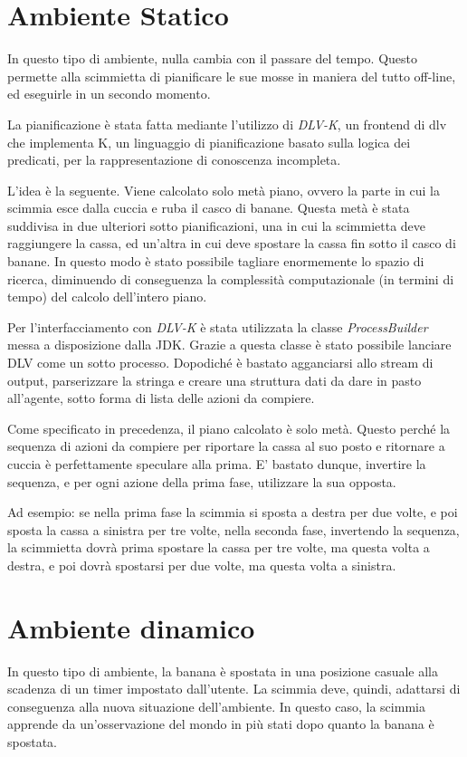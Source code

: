 \documentclass[a4paper,10pt]{article}
\begin{document}
    \section{Ambiente Statico}
	In questo tipo di ambiente, nulla cambia con il passare del tempo. Questo permette alla scimmietta di pianificare le sue mosse in
	maniera del tutto off-line, ed eseguirle in un secondo momento.
	
	La pianificazione è stata fatta mediante l'utilizzo di \emph{DLV-K}, un frontend di dlv che implementa K, un linguaggio di pianificazione
	basato sulla logica dei predicati, per la rappresentazione di conoscenza incompleta.
	
	L'idea è la seguente. Viene calcolato solo metà piano, ovvero la parte in cui la scimmia esce dalla cuccia e ruba il casco di banane.
	Questa metà è stata suddivisa in due ulteriori sotto pianificazioni, una in cui la scimmietta deve raggiungere
	la cassa, ed un'altra in cui deve spostare la cassa fin sotto il casco di banane. In questo modo è stato possibile tagliare enormemente
	lo spazio di ricerca, diminuendo di conseguenza la complessità computazionale (in termini di tempo) del calcolo dell'intero piano.
	
	Per l'interfacciamento con \emph{DLV-K} è stata utilizzata la classe \emph{ProcessBuilder} messa a disposizione dalla JDK.
	Grazie a questa classe è stato possibile lanciare DLV come un sotto processo.
	Dopodiché è bastato agganciarsi allo stream di output, parserizzare
	la stringa e creare una struttura dati da dare in pasto all'agente, sotto forma di lista delle azioni da compiere.
	
	Come specificato in precedenza, il piano calcolato è solo metà. Questo perché la sequenza di azioni
	da compiere per riportare la cassa al suo posto e ritornare a cuccia è perfettamente speculare alla prima. E' bastato
	dunque, invertire la sequenza, e per ogni azione della prima fase, utilizzare la sua opposta.
	
	Ad esempio: se nella prima fase la scimmia si sposta a destra per due volte, e poi sposta la cassa a sinistra per tre volte,
	nella seconda fase, invertendo la sequenza, la scimmietta dovrà
	prima spostare la cassa per tre volte, ma questa volta a destra, e poi dovrà spostarsi per due volte, ma questa volta a sinistra.
	
    \section{Ambiente dinamico}
	In questo tipo di ambiente, la banana è spostata in una posizione casuale alla scadenza di un timer impostato dall'utente.
	La scimmia deve, quindi, adattarsi di conseguenza alla nuova situazione dell'ambiente. 
	In questo caso, la scimmia apprende da un'osservazione del mondo in più stati dopo quanto la banana è spostata.
	
\end{document}
